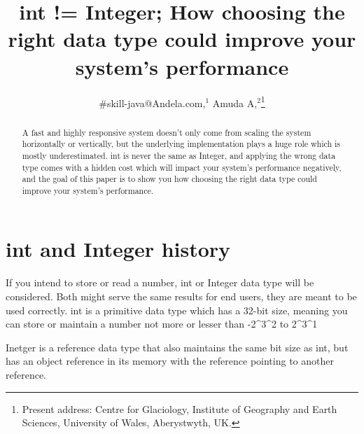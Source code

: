 \documentclass[aog]{igs}
\begin{document}
\title[IGS \LaTeXe\ guide]{int != Integer; How choosing the right data type could improve your system's performance}

\author[Baxter and others]{#skill-java@Andela.com,$^1$
  Amuda A,$^2$\protect\thanks{Present address:
  Centre for Glaciology, Institute of Geography and
  Earth Sciences, University of Wales, Aberystwyth,
  UK.}}


\begin{frontmatter}

\maketitle

\begin{abstract}

A fast and highly responsive system doesn't only come from scaling the system horizontally or vertically, but the underlying implementation
plays a huge role which is mostly underestimated. int is never the same as Integer, and applying the wrong data type comes with a hidden cost which will impact your system's performance negatively, and the goal of this paper is to show you how choosing the right data type could improve your system's performance.
\end{abstract}

\end{frontmatter}


\section{int and Integer history}

If you intend to store or read a number, int or Integer data type will be considered. Both might serve the same results for end users,
they are meant to be used correctly. int is a primitive data type which has a 32-bit size, meaning you can store or maintain a number not more or lesser than -2^3^2 to 2^3^1

Inetger is a reference data type that also maintains the same bit size as int, but has an object reference in its memory with the reference
pointing to another reference.
\end{document}
